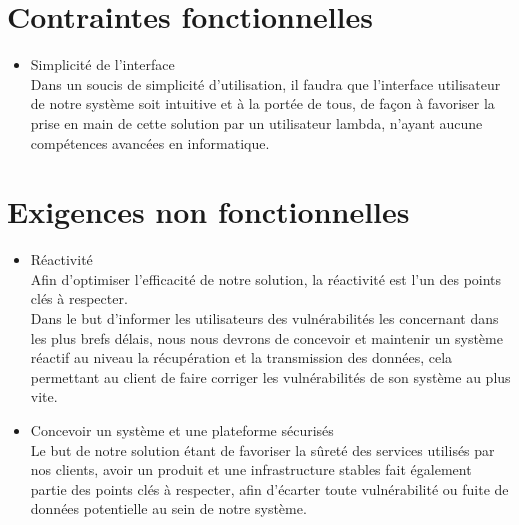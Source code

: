 \section{Contraintes fonctionnelles}
\begin{itemize}
\item Simplicité de l'interface\\
Dans un soucis de simplicité d'utilisation, il faudra que l'interface utilisateur de notre système soit intuitive et à la portée de tous, de façon à favoriser la prise en main de cette solution par un utilisateur lambda, n'ayant aucune compétences avancées en informatique.\\
\end{itemize}

\section{Exigences non fonctionnelles}
\begin{itemize}
\item Réactivité\\
Afin d'optimiser l'efficacité de notre solution, la réactivité est l'un des points clés à respecter.\\
Dans le but d'informer les utilisateurs des vulnérabilités les concernant dans les plus brefs délais, nous nous devrons de concevoir et maintenir un système réactif au niveau la récupération et la transmission des données, cela permettant au client de faire corriger les vulnérabilités de son système au plus vite.\\

\item Concevoir un système et une plateforme sécurisés\\
Le but de notre solution étant de favoriser la sûreté des services utilisés par nos clients, avoir un produit et une infrastructure stables fait également partie des points clés à respecter, afin d'écarter toute vulnérabilité ou fuite de données potentielle au sein de notre système.\\
\end{itemize}